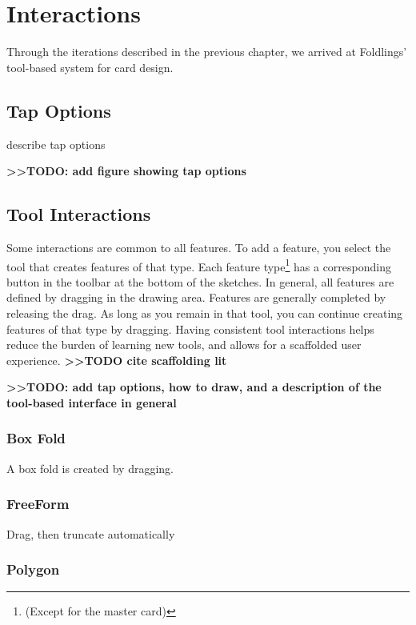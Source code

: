 \section{Interactions}\label{interactions}

Through the iterations described in the previous chapter, we arrived at
Foldlings' tool-based system for card design.

\subsection{Tap Options}\label{tap-options}

describe tap options

\textbf{\textgreater{}\textgreater{}TODO: add figure showing tap
options}

\subsection{Tool Interactions}\label{tool-interactions}

Some interactions are common to all features. To add a feature, you
select the tool that creates features of that type. Each feature
type\footnote{(Except for the master card)} has a corresponding button
in the toolbar at the bottom of the sketches. In general, all features
are defined by dragging in the drawing area. Features are generally
completed by releasing the drag. As long as you remain in that tool, you
can continue creating features of that type by dragging. Having
consistent tool interactions helps reduce the burden of learning new
tools, and allows for a scaffolded user experience.
\textbf{\textgreater{}\textgreater{}TODO cite scaffolding lit}

\textbf{\textgreater{}\textgreater{}TODO: add tap options, how to draw,
and a description of the tool-based interface in general}

\subsubsection{Box Fold}\label{box-fold}

A box fold is created by dragging.

\subsubsection{FreeForm}\label{freeform}

Drag, then truncate automatically

\subsubsection{Polygon}\label{polygon}

